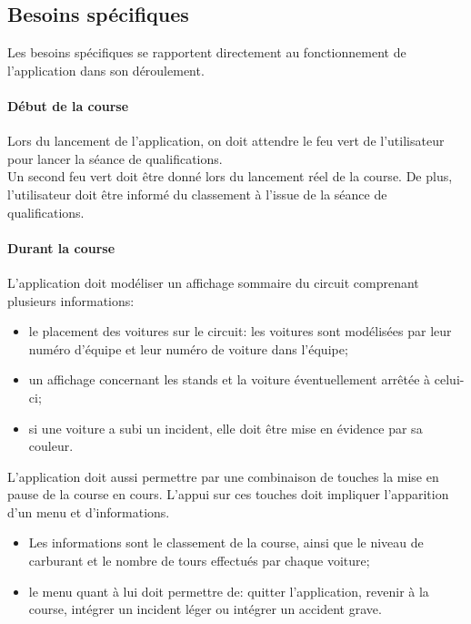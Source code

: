 \documentclass[a4paper, 11pt]{report}
\begin{document}
			\subsection{Besoins spécifiques}
			
			Les besoins spécifiques se rapportent directement au fonctionnement de l'application dans son déroulement.
			
				\paragraph{Début de la course}
				Lors du lancement de l'application, on doit attendre le feu vert de l'utilisateur pour lancer la séance de qualifications. \\
				Un second feu vert doit être donné lors du lancement réel de la course. De plus, l'utilisateur doit être informé du classement à l'issue de la séance de qualifications.
			
			
				\paragraph{Durant la course}
				
				L'application doit modéliser un affichage sommaire du circuit comprenant plusieurs informations:
				\begin{itemize}
					\item le placement des voitures sur le circuit: les voitures sont modélisées par leur numéro d'équipe et leur numéro de voiture dans l'équipe;
					\item un affichage concernant les stands et la voiture éventuellement arrêtée à celui-ci;
					\item si une voiture a subi un incident, elle doit être mise en évidence par sa couleur.\\
				\end{itemize}
				
				L'application doit aussi permettre par une combinaison de touches la mise en pause de la course en cours. L'appui sur ces touches doit impliquer l'apparition d'un menu et d'informations.
				\begin{itemize}
					\item Les informations sont le classement de la course, ainsi que le niveau de carburant et le nombre de tours effectués par chaque voiture;
					\item le menu quant à lui doit permettre de: quitter l'application, revenir à la course, intégrer un incident léger ou intégrer un accident grave.
\end{itemize}			
\end{document}
